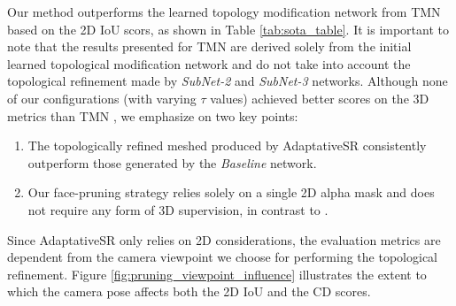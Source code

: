 Our method outperforms the learned topology modification network from TMN \citep{pan2019deep} based on the 2D \ac{IoU} scors, as shown in Table \ref{tab:sota_table}. It is important to note that the results presented for TMN \citep{pan2019deep} are derived solely from the initial learned topological modification network and do not take into account the topological refinement made by \textit{SubNet-2} and \textit{SubNet-3} networks. Although none of our configurations (with varying $\tau$ values) achieved better scores on the 3D metrics than TMN \citep{pan2019deep}, we emphasize on two key points: \begin{enumerate}
    \item The topologically refined meshed produced by AdaptativeSR consistently outperform those generated by the \textit{Baseline} network.  
    \item Our face-pruning strategy relies solely on a single 2D alpha mask and does not require any form of 3D supervision, in contrast to \citep{pan2019deep}. 
\end{enumerate}

Since AdaptativeSR only relies on 2D considerations, the evaluation metrics are dependent from the camera viewpoint we choose for performing the topological refinement. Figure \ref{fig:pruning_viewpoint_influence} illustrates the extent to which the camera pose affects both the 2D \ac{IoU} and the \ac{CD} scores.

